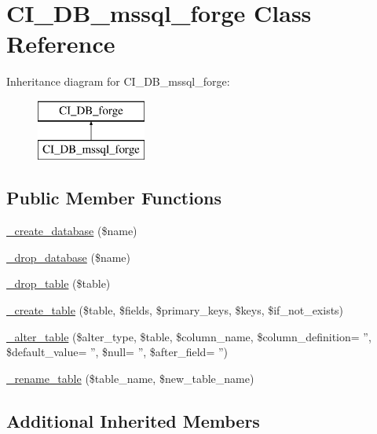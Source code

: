 \hypertarget{class_c_i___d_b__mssql__forge}{\section{C\-I\-\_\-\-D\-B\-\_\-mssql\-\_\-forge Class Reference}
\label{class_c_i___d_b__mssql__forge}
}
Inheritance diagram for C\-I\-\_\-\-D\-B\-\_\-mssql\-\_\-forge\-:\begin{figure}[H]
\begin{center}
\leavevmode
\includegraphics[height=2.000000cm]{class_c_i___d_b__mssql__forge}
\end{center}
\end{figure}
\subsection*{Public Member Functions}
\begin{DoxyCompactItemize}
\item 
\hyperlink{class_c_i___d_b__mssql__forge_ac70184ae4a86e97f324daa1901b78777}{\-\_\-create\-\_\-database} (\$name)
\item 
\hyperlink{class_c_i___d_b__mssql__forge_a6e04d0af5e8e1e1f93f42d63f0744bfd}{\-\_\-drop\-\_\-database} (\$name)
\item 
\hyperlink{class_c_i___d_b__mssql__forge_a147efb0d859b7cf4148ff75642515231}{\-\_\-drop\-\_\-table} (\$table)
\item 
\hyperlink{class_c_i___d_b__mssql__forge_a99d4c17257f468337344690dd590582b}{\-\_\-create\-\_\-table} (\$table, \$fields, \$primary\-\_\-keys, \$keys, \$if\-\_\-not\-\_\-exists)
\item 
\hyperlink{class_c_i___d_b__mssql__forge_a34fc29f48662e18f6a4f3185a8ea206c}{\-\_\-alter\-\_\-table} (\$alter\-\_\-type, \$table, \$column\-\_\-name, \$column\-\_\-definition= '', \$default\-\_\-value= '', \$null= '', \$after\-\_\-field= '')
\item 
\hyperlink{class_c_i___d_b__mssql__forge_aec593ba62c6ff875cafeac16b1c54ae6}{\-\_\-rename\-\_\-table} (\$table\-\_\-name, \$new\-\_\-table\-\_\-name)
\end{DoxyCompactItemize}
\subsection*{Additional Inherited Members}


